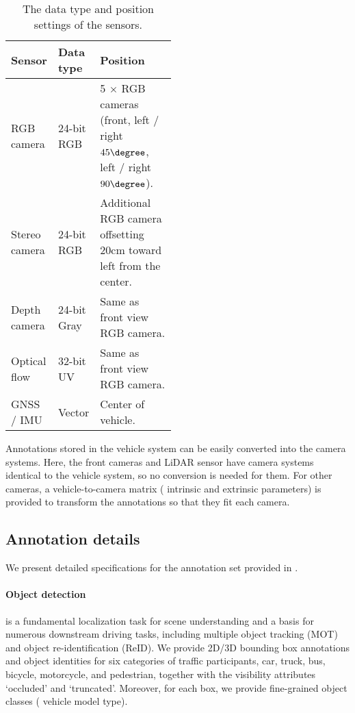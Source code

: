 \begin{table}[t]
    \centering
    \footnotesize
    \begin{tabular}{ll p{0.48\linewidth}}
    \toprule
      \textbf{Sensor}  &  \textbf{Data type} & \textbf{Position} \\
         \midrule
        RGB camera & 24-bit RGB & 5 $\times$ RGB cameras (front, left / right $45\degree$, left / right $90\degree$). \\
        Stereo camera & 24-bit RGB & Additional RGB camera offsetting $20\mathrm{cm}$ toward left from the center. \\
        Depth camera & 24-bit Gray & Same as front view RGB camera. \\
        Optical flow & 32-bit UV & Same as front view RGB camera. \\
        GNSS / IMU & Vector & Center of vehicle. \\
    \bottomrule
    \end{tabular}
    \caption{The data type and position settings of the sensors.}
    \label{tab:sensors}
\end{table}

Annotations stored in the vehicle system can be easily converted into the camera systems. Here, the front cameras and LiDAR sensor have camera systems identical to the vehicle system, so no conversion is needed for them. For other cameras, a vehicle-to-camera matrix (\ie{} intrinsic and extrinsic parameters) is provided to transform the annotations so that they fit each camera. 

\subsection{Annotation details} \label{ssec:dataset_annotations}
We present detailed specifications for the annotation set provided in \thedataset{}.

\paragraph{Object detection} is a fundamental localization task for scene understanding and a basis for numerous downstream driving tasks, including multiple object tracking (MOT) and object re-identification (ReID). 
We provide 2D/3D bounding box annotations and object identities for six categories of traffic participants, \ie{} car, truck, bus, bicycle, motorcycle, and pedestrian, together with the visibility attributes `occluded' and `truncated'.
Moreover, for each box, we provide fine-grained object classes (\eg{} vehicle model type).

